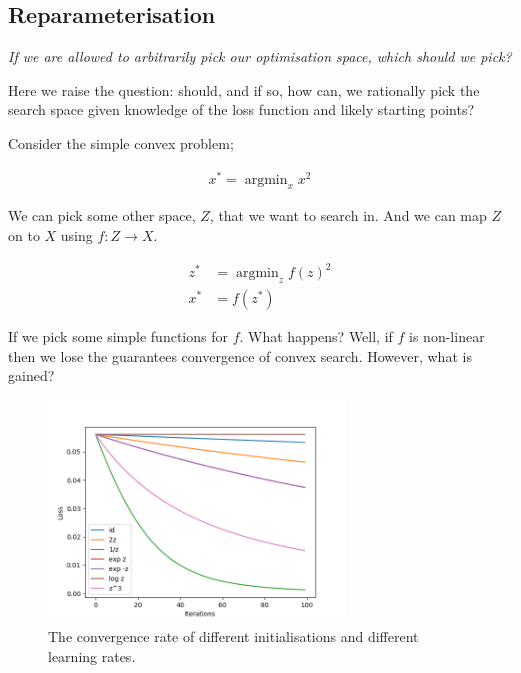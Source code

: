 \newpage
\subsection{Reparameterisation}\label{reparameterisation}

\begin{displayquote}
  \textsl{If we are allowed to arbitrarily pick our optimisation space, which should we pick?}
\end{displayquote}

Here we raise the question: should, and if so, how can, we rationally pick the
search space given knowledge of the loss function and likely starting points?

Consider the simple convex problem;

\begin{align*}
  x^{* } = \mathop{\text{argmin}}_{x} x^2
\end{align*}

We can pick some other space, $Z$, that we want to search in. And we can map $Z$ on to $X$ using $f: Z \to X$.

\begin{align*}
  z^{* } &=\mathop{\text{argmin}}_{z} f(z)^2 \\
    x^{* } &= f(z^{* })
\end{align*}

If we pick some simple functions for $f$. What happens? Well, if $f$ is non-linear
then we lose the guarantees convergence of convex search. However, what is gained?

\begin{figure}[h!]
\centering
\includegraphics[width=0.7\textwidth,height=0.35\textheight]{../../pictures/figures/reparam-ce-04.png}
\caption{The convergence rate of different initialisations and different learning rates.}
\end{figure}

